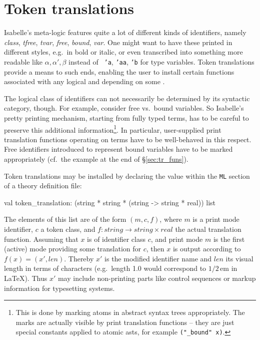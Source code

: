 \section{Token translations} \label{sec:tok_tr}
%
Isabelle's meta-logic features quite a lot of different kinds of
identifiers, namely {\em class}, {\em tfree}, {\em tvar}, {\em free},
{\em bound}, {\em var}.  One might want to have these printed in
different styles, e.g.\ in bold or italic, or even transcribed into
something more readable like $\alpha, \alpha', \beta$ instead of {\tt
  'a}, {\tt 'aa}, {\tt 'b} for type variables.  Token translations
provide a means to such ends, enabling the user to install certain
\ML{} functions associated with any logical  and
depending on some .

The logical class of identifiers can not necessarily be determined by
its syntactic category, though.  For example, consider free vs.\ bound
variables.  So Isabelle's pretty printing mechanism, starting from
fully typed terms, has to be careful to preserve this additional
information\footnote{This is done by marking atoms in abstract syntax
  trees appropriately.  The marks are actually visible by print
  translation functions -- they are just special constants applied to
  atomic asts, for example \texttt{("_bound" x)}.}.  In particular,
user-supplied print translation functions operating on terms have to
be well-behaved in this respect.  Free identifiers introduced to
represent bound variables have to be marked appropriately (cf.\ the
example at the end of \S\ref{sec:tr_funs}).

\medskip Token translations may be installed by declaring the
 value within the \texttt{ML} section of a theory
definition file:
\begin{ttbox}
val token_translation: 
      (string * string * (string -> string * real)) list
\end{ttbox}
The elements of this list are of the form $(m, c, f)$, where $m$ is a print
mode identifier, $c$ a token class, and $f\colon string \to string \times
real$ the actual translation function.  Assuming that $x$ is of identifier
class $c$, and print mode $m$ is the first (active) mode providing some
translation for $c$, then $x$ is output according to $f(x) = (x', len)$.
Thereby $x'$ is the modified identifier name and $len$ its visual length in
terms of characters (e.g.\ length 1.0 would correspond to $1/2$\,em in
\LaTeX).  Thus $x'$ may include non-printing parts like control sequences or
markup information for typesetting systems.




